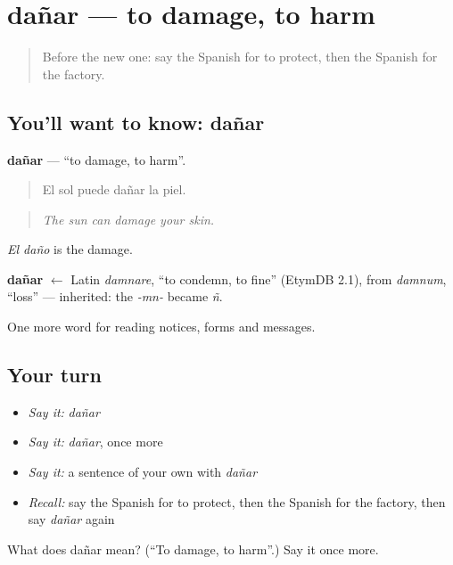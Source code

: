 \section[dañar]{dañar — to damage, to harm}

\label{lesson:ES-C504-danar}



\begin{quote}
Before the new one: say the Spanish for to protect, then the Spanish for the factory.
\end{quote}

\subsection*{You'll want to know: dañar}
\textbf{dañar} — \textquotedblleft{}to damage, to harm\textquotedblright{}.

\begin{quote}
El sol puede dañar la piel.
\end{quote}

\begin{quote}
\emph{The sun can damage your skin.}
\end{quote}

\emph{El daño} is the damage.

\begin{cousinweb}
\textbf{dañar} $\leftarrow$ Latin \emph{damnare}, \textquotedblleft{}to condemn, to fine\textquotedblright{} (EtymDB 2.1), from \emph{damnum}, \textquotedblleft{}loss\textquotedblright{} — inherited: the \emph{-mn-} became \emph{ñ}.
\end{cousinweb}

\begin{grammarlens}[title={What you've built}]
One more word for reading notices, forms and messages.
\end{grammarlens}

\subsection*{Your turn}
\begin{itemize}
\raggedright
  \item \emph{Say it:} \emph{dañar}
  \item \emph{Say it:} \emph{dañar}, once more
  \item \emph{Say it:} a sentence of your own with \emph{dañar}
  \item \emph{Recall:} say the Spanish for to protect, then the Spanish for the factory, then say \emph{dañar} again
\end{itemize}

\begin{tcolorbox}[breakable,colback=teal!4,colframe=teal!35!black,title={Before you move on}]
What does dañar mean? (\textquotedblleft{}To damage, to harm\textquotedblright{}.) Say it once more.
\end{tcolorbox}
